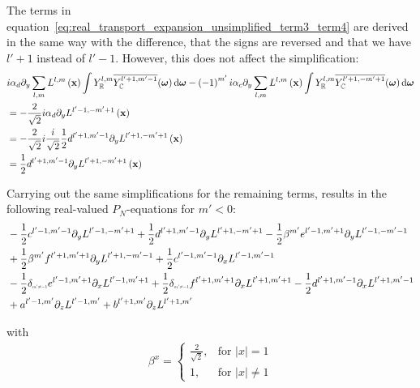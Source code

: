 The terms in equation~\ref{eq:real_transport_expansion_unsimplified_term3_term4} are derived in the same way with the difference, that the signs are reversed and that we have $l'+1$ instead of $l'-1$. However, this does not affect the simplification:
\begin{align*}
&i\alpha_d\partial_y\sum_{l,m}L^{l,m}\left (\boldsymbol{\mathbf{x}}\right)\int{Y_{\mathbb{R}}^{l,m}\overline{Y_{\mathbb{C}}^{l'+1, m'-1}}(\boldsymbol{\mathbf{\omega}} )\,\mathrm{d}\boldsymbol{\mathbf{\omega}}}
-\left({-1}\right)^{m'}i\alpha_c\partial_y\sum_{l,m}L^{l,m}\left (\boldsymbol{\mathbf{x}}\right)\int{Y_{\mathbb{R}}^{l,m}\overline{Y_{\mathbb{C}}^{l'+1, -m'+1}}(\boldsymbol{\mathbf{\omega}} )\,\mathrm{d}\boldsymbol{\mathbf{\omega}}}
\\
&=-\frac{2}{\sqrt{2}}i
\alpha_d\partial_y
L^{l'-1,-m'+1}\left (\boldsymbol{\mathbf{x}}\right)
\\
&=-\frac{2}{\sqrt{2}}i
\frac{i}{\sqrt{2}}\frac{1}{2}d^{{l'+1,m'-1}}
\partial_y
L^{l'+1,-m'+1}\left (\boldsymbol{\mathbf{x}}\right)
\\
&=
\frac{1}{2}d^{{l'+1,m'-1}}
\partial_y
L^{l'+1,-m'+1}\left (\boldsymbol{\mathbf{x}}\right)
\end{align*}

Carrying out the same simplifications for the remaining terms, results in the following real-valued $P_N$-equations for $m'<0$:
\begin{align*}
&-\frac{1}{2}c^{{l'-1,m'-1}}
\partial_y
L^{l'-1,-m'+1}
+\frac{1}{2}d^{{l'+1,m'-1}}
\partial_y
L^{l'+1,-m'+1}
-\frac{1}{2}\beta^{m'}e^{{l'-1,m'+1}}
\partial_y
L^{l'-1,-m'-1}
\\&
+\frac{1}{2}\beta^{m'}f^{{l'+1,m'+1}}
\partial_y
L^{l'+1,-m'-1}
+\frac{1}{2}c^{{l'-1,m'-1}}
\partial_x
L^{l'-1,m'-1}
\\&
-\frac{1}{2}\delta_{\scaleto{m'\neq -1}{4pt}}e^{{l'-1,m'+1}}
\partial_x
L^{l'-1,m'+1}
+\frac{1}{2}\delta_{\scaleto{m'\neq -1}{4pt}}f^{{l'+1,m'+1}}
\partial_x
L^{l'+1,m'+1}
-\frac{1}{2}d^{{l'+1,m'-1}}
\partial_x
L^{l'+1,m'-1}
\\&
+a^{{l'-1,m'}}
\partial_z
L^{l'-1,m'}
+b^{{l'+1,m'}}
\partial_z
L^{l'+1,m'}
\end{align*}

with
\begin{align}
\label{eq:real_sh_basis}
\beta^{x}=
\left\{
\begin{array}{lr}
\frac{2}{\sqrt{2}}, & \text{for } \vert x\vert = 1\\
1, & \text{for } \vert x\vert \neq 1
\end{array}
\right.
\end{align}


